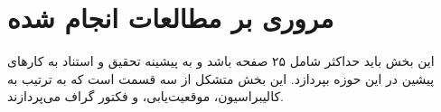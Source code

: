 \chapter{مروری بر مطالعات انجام شده}

این بخش باید حداکثر شامل ۲۵ صفحه باشد و به پیشینه تحقیق و استناد به کارهای پیشین در این حوزه بپردازد. این بخش متشکل از سه قسمت است که به ترتیب به کالیبراسیون، موقعیت‌یابی، و فکتور گراف می‌پردازند. 